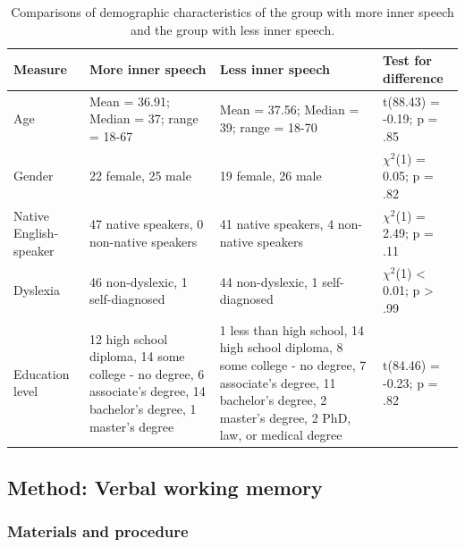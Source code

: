 \documentclass[
  man,a4paper,floatsintext]{apa6}
\begin{document}
\begin{table}[!h]

\caption{\label{tab:demographics}Comparisons of demographic characteristics of the group with more inner speech and the group with less inner speech.}
\centering
\fontsize{8}{10}\selectfont
\begin{tabu} to 
\toprule
\textbf{Measure} & \textbf{More inner speech} & \textbf{Less inner speech} & \textbf{Test for difference}\\
\midrule
Age & Mean = 36.91; Median = 37;
range = 18-67 & Mean = 37.56; Median = 39;
range = 18-70 & t(88.43) = -0.19; p = .85\\
Gender & 22 female, 25 male & 19 female, 26 male & $\chi^{2}$(1) = 0.05; p = .82\\
Native English-speaker & 47 native speakers,
0 non-native speakers & 41 native speakers,
4 non-native speakers & $\chi^{2}$(1) = 2.49; p = .11\\
Dyslexia & 46 non-dyslexic,
1 self-diagnosed & 44 non-dyslexic,
1 self-diagnosed & $\chi^{2}$(1) < 0.01; p > .99\\
Education level & 12 high school diploma,
14 some college - no degree,
6 associate's degree,
14 bachelor's degree,
1 master's degree & 1 less than high school,
14 high school diploma,
8 some college - no degree,
7 associate's degree,
11 bachelor's degree,
2 master's degree,
2 PhD, law, or medical degree & t(84.46) = -0.23; p = .82\\
\bottomrule
\end{tabu}
\end{table}

\hypertarget{method-verbal-working-memory}{%
\subsection{Method: Verbal working memory}\label{method-verbal-working-memory}}

\hypertarget{materials-and-procedure}{%
\subsubsection{Materials and procedure}\label{materials-and-procedure}}
\end{document}
